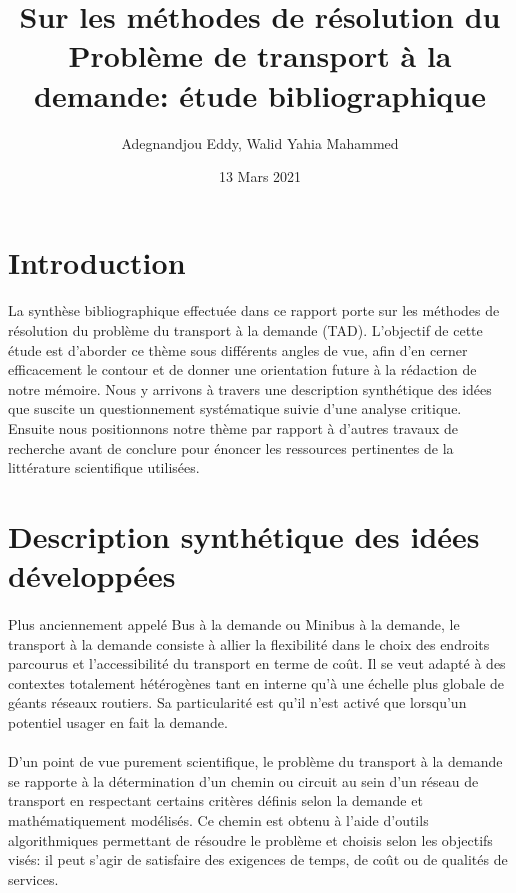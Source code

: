\documentclass{article}
\begin{document}
\title{Sur les méthodes de résolution du Problème de transport à la demande: étude bibliographique}
\author{Adegnandjou Eddy, Walid Yahia Mahammed}
\date{13 Mars 2021}
\maketitle

\newpage

\section{Introduction}

\paragraph{}
La synthèse bibliographique effectuée dans ce rapport porte sur les méthodes de résolution du problème du transport à la demande (TAD). L'objectif de cette étude est d'aborder ce thème sous différents angles de vue, afin d'en cerner efficacement le contour et de donner une orientation future à la rédaction de notre mémoire. Nous y arrivons à travers une description synthétique des idées que suscite un questionnement systématique suivie d'une analyse critique. Ensuite nous positionnons notre thème par rapport à d'autres travaux de recherche avant de conclure pour énoncer les ressources pertinentes de la littérature scientifique utilisées.


\section{Description synthétique des idées développées}

\paragraph{}
Plus anciennement appelé Bus à la demande ou Minibus à la demande, le transport à la demande consiste à allier la flexibilité dans le choix des endroits parcourus et l’accessibilité du transport en terme de coût. Il se veut adapté à des contextes totalement hétérogènes tant en interne qu’à une échelle plus globale de géants réseaux routiers. Sa particularité est qu’il n’est activé que lorsqu’un potentiel usager en fait la demande.

\paragraph{}
D'un point de vue purement scientifique, le problème du transport à la demande se rapporte à la détermination d'un chemin ou circuit au sein d'un réseau de transport en respectant certains critères définis selon la demande et mathématiquement modélisés. Ce chemin est obtenu à l'aide d'outils algorithmiques permettant de résoudre le problème et choisis selon les objectifs visés: il peut s'agir de satisfaire des exigences de temps, de coût ou de qualités de services.
\end{document}
